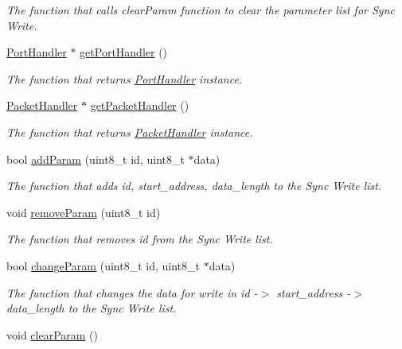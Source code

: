 \begin{DoxyCompactItemize}
\begin{DoxyCompactList}\small\item\em The function that calls clear\+Param function to clear the parameter list for Sync Write. \end{DoxyCompactList}\item 
\hyperlink{classmercury_1_1_port_handler}{Port\+Handler} $\ast$ \hyperlink{classmercury_1_1_write_composite_abb8575d349e8b5d60eb8cfcb180c15e2}{get\+Port\+Handler} ()
\begin{DoxyCompactList}\small\item\em The function that returns \hyperlink{classmercury_1_1_port_handler}{Port\+Handler} instance. \end{DoxyCompactList}\item 
\hyperlink{classmercury_1_1_packet_handler}{Packet\+Handler} $\ast$ \hyperlink{classmercury_1_1_write_composite_a26311329992011ef20eed8702b72bccd}{get\+Packet\+Handler} ()
\begin{DoxyCompactList}\small\item\em The function that returns \hyperlink{classmercury_1_1_packet_handler}{Packet\+Handler} instance. \end{DoxyCompactList}\item 
bool \hyperlink{classmercury_1_1_write_composite_a2aa7d4d41e0c0eb7290393740a19b049}{add\+Param} (uint8\+\_\+t id, uint8\+\_\+t $\ast$data)
\begin{DoxyCompactList}\small\item\em The function that adds id, start\+\_\+address, data\+\_\+length to the Sync Write list. \end{DoxyCompactList}\item 
void \hyperlink{classmercury_1_1_write_composite_a7a3d69b52b70d34cae02c89aada27efa}{remove\+Param} (uint8\+\_\+t id)
\begin{DoxyCompactList}\small\item\em The function that removes id from the Sync Write list. \end{DoxyCompactList}\item 
bool \hyperlink{classmercury_1_1_write_composite_a00e8c031549b838922f5fb92d86ff3b6}{change\+Param} (uint8\+\_\+t id, uint8\+\_\+t $\ast$data)
\begin{DoxyCompactList}\small\item\em The function that changes the data for write in id -\/$>$ start\+\_\+address -\/$>$ data\+\_\+length to the Sync Write list. \end{DoxyCompactList}\item 
void \hyperlink{classmercury_1_1_write_composite_a8a98a953c7c6b12c10f5dbc57fd9cab1}{clear\+Param} ()\hypertarget{classmercury_1_1_write_composite_a8a98a953c7c6b12c10f5dbc57fd9cab1}{}\label{classmercury_1_1_write_composite_a8a98a953c7c6b12c10f5dbc57fd9cab1}


\end{DoxyCompactItemize}
